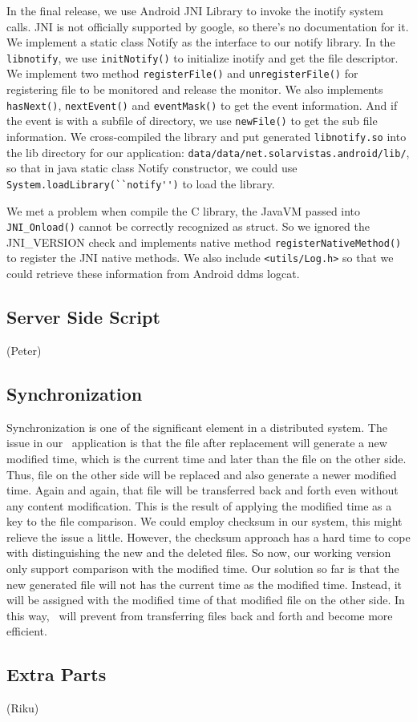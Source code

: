 In the final release, we use Android JNI Library to invoke the inotify system calls. JNI is not officially supported by 
google, so there's no documentation for it. We implement a static class Notify as the interface to our notify library. 
In the \verb+libnotify+, we use \verb+initNotify()+ to initialize inotify and get the file descriptor. We implement two 
method \verb+registerFile()+ and \verb+unregisterFile()+ for registering file to be monitored and release the monitor. 
We also implements \verb+hasNext()+, \verb+nextEvent()+ and \verb+eventMask()+ to get the event information. And if the 
event is with a subfile of directory, we use \verb+newFile()+ to get the sub file information. We cross-compiled the 
library and put generated \verb+libnotify.so+ into the lib directory for our application: 
\verb+data/data/net.solarvistas.android/lib/+, so that in java static class Notify constructor, we could use 
\verb+System.loadLibrary(``notify'')+ to load the library. 

We met a problem when compile the C library, the JavaVM passed into \verb+JNI_Onload()+ cannot be correctly recognized 
as struct. So we ignored the JNI\_VERSION check and implements native method \verb+registerNativeMethod()+ to register 
the JNI native methods. We also include \verb+<utils/Log.h>+ so that we could retrieve these information from Android 
ddms logcat.

\subsection{Server Side Script}
(Peter)

\subsection{Synchronization}
Synchronization is one of the significant element in a distributed system. The issue in our \teledroid\ application is that the file after replacement will generate a new modified time, which is the current time and later than the file on the other side. Thus, file on the other side will be replaced and also generate a newer modified time. Again and again, that file will be transferred back and forth even without any content modification. This is the result of applying the modified time as a key to the file comparison. We could employ checksum in our system, this might relieve the issue a little. However, the checksum approach has a hard time to cope with distinguishing the new and the deleted files. So now, our working version only support comparison with the modified time. Our solution so far is that the new generated file will not has the current time as the modified time. Instead, it will be assigned with the modified time of that modified file on the other side. In this way, \teledroid\ will prevent from transferring files back and forth and become more efficient.

\subsection{Extra Parts}
(Riku)
